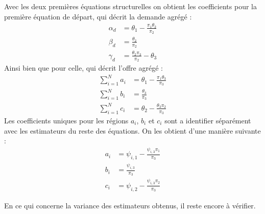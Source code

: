 \documentclass[11pt, a4paper]{article}
\begin{document}
\par
Avec les deux premières équations structurelles on obtient les coefficients pour la première équation de départ, qui décrit la demande agrégé :
\begin{align}
  \alpha_d & = \theta_1 - \frac{\pi_1 \theta_2}{\pi_2} \\
  \beta_d & = \frac{\theta_2}{\pi_2} \\
  \gamma_d & = \frac{\theta_2 \pi_3}{\pi_2} - \theta_3
\end{align}
Ainsi bien que pour celle, qui décrit l'offre agrégé :
\begin{align}
  \sum_{i = 1}^{N} a_i & = \theta_1 - \frac{\pi_1 \theta_3}{\pi_3} \\
  \sum_{i = 1}^{N} b_i & = \frac{\theta_3}{\pi_3} \\
  \sum_{i = 1}^{N} c_i & = \theta_2 - \frac{\theta_3 \pi_2}{\pi_3}
\end{align}
Les coefficients uniques pour les régions $a_i$, $b_i$ et $c_i$ sont a identifier séparément avec les estimateurs du reste des équations.
On les obtient d'une manière suivante :
\begin{align}
  a_i & = \psi_{i,1} - \frac{\psi_{i,3} \pi_1}{\pi_3} \\
  b_i & = \frac{\psi_{i,3}}{\pi_3} \\
  c_i & = \psi_{i,2} - \frac{\psi_{i,3} \pi_2}{\pi_3}
\end{align}
\par
En ce qui concerne la variance des estimateurs obtenus, il reste encore à vérifier.
\end{document}
